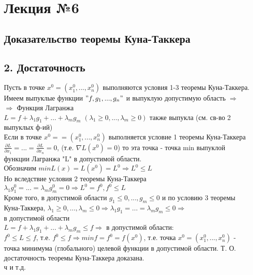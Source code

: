 \documentclass[a4paper]{article}
\begin{document}
\Large
\section*{Лекция №6}
\subsection*{Доказательство теоремы Куна-Таккера}
\subsection*{2. Достаточность}
Пусть в точке $x^0 = (x_1^0, ..., x_n^0)$ выполняются условия 1-3 теоремы Куна-Таккера. \\
Имеем выпуклые функции $"f, g_1, ..., g_n"$ и выпуклую допустимую область $\Rightarrow$ \\
$\Rightarrow$ Функция Лагранжа \\
$L = f + \lambda_1g_1 + ... + \lambda_m g_m$ $(\lambda_1 \geqslant 0, ..., \lambda_m \geqslant 0)$ также выпукла (см. св-во 2 выпуклых ф-ий) \\
Если в точке $x^0 = = (x_1^0, ..., x_n^0)$ выполняется условие 1 теоремы Куна-Таккера
$\frac{\partial L}{\partial x_1} = ... = \frac{\partial L}{\partial x_n} = 0$, (т.е. $\nabla L (x^0) = 0$) то эта точка - точка min выпуклой функции Лагранжа "L" в допустимой области. \\
Обозначим $min L(x) = L (x^0) = L^0 \Rightarrow L^0 \leqslant L$ \\
Но вследствие условия 2 теоремы Куна-Таккера \\
$\lambda_1 g_1^0 = ... = \lambda_m g_m^0 = 0 \Rightarrow L^0 = f^0, f^0 \leqslant L$ \\
Кроме того, в допустимой области $g_1 \leqslant 0, ..., g_m \leqslant 0$ и по условию 3 теоремы Куна-Таккера, $\lambda_1 \geqslant 0, ..., \lambda_m \leqslant 0 \Rightarrow \lambda_1 g_1 = ... = \lambda_m g_m \leqslant 0 \Rightarrow$ \\
в допустимой области \\
$L = f + \lambda_1 g_1 + ... + \lambda_m g_m \leqslant f \Rightarrow$ в допустимой области: \\
$f^0 \leqslant L \leqslant f$, т.е. $f^0 \leqslant f \Rightarrow min f = f^0 = f(x^0)$, т.е. точка $x^0 = (x_1^0, ..., x_n^0)$
- точка минимума (глобального) целевой функции в допустимой области. 
Т. О. достаточность теоремы Куна-Таккера доказана. \\
ч и т.д. 
\end{document}
